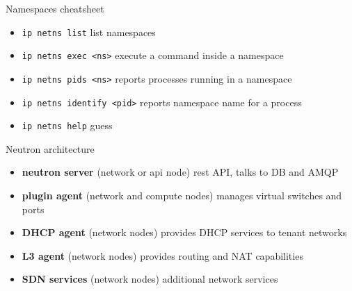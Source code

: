 \documentclass[english,serif,mathserif,xcolor=pdftex,dvipsnames,table]{beamer}
\begin{document}
\begin{frame}
  {Namespaces cheatsheet}

  \begin{itemize}
  \item \texttt{ip netns list} list namespaces
  \+\item \texttt{ip netns exec <ns>} execute a command inside a
    namespace
  \+\item \texttt{ip netns pids <ns>} reports processes running in a
    namespace
  \+\item \texttt{ip netns identify <pid>} reports namespace name for a
    process
  \+\item \texttt{ip netns help} guess
  \end{itemize}
\end{frame}


\begin{frame}
  {Neutron architecture}
  \begin{itemize}
  \item \textbf{neutron server} (network or api node) rest API, talks to DB and AMQP
  \item \textbf{plugin agent} (network and compute nodes) manages virtual
    switches and ports
  \item \textbf{DHCP agent} (network nodes) provides DHCP services to tenant networks
  \item \textbf{L3 agent} (network nodes) provides routing and NAT capabilities
  \item \textbf{SDN services} (network nodes) additional network services
  \end{itemize}
\end{frame}

%
%
%
%
%
%
%
%
%
\end{document}
